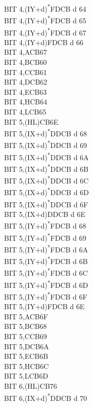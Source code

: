 \documentclass[twoside,openright,a4paper]{book}
\begin{document}
\begin{multicols}{3}
{\begin{tabbing}
	BIT 4,(IY+d)\textsuperscript{*}\>FDCB d 64\\
	BIT 4,(IY+d)\textsuperscript{*}\>FDCB d 65\\
	BIT 4,(IY+d)\textsuperscript{*}\>FDCB d 67\\
	BIT 4,(IY+d)\>FDCB d 66\\
	BIT 4,A\>CB67\\
	BIT 4,B\>CB60\\
	BIT 4,C\>CB61\\
	BIT 4,D\>CB62\\
	BIT 4,E\>CB63\\
	BIT 4,H\>CB64\\
	BIT 4,L\>CB65\\
	BIT 5,(HL)\>CB6E\\
	BIT 5,(IX+d)\textsuperscript{*}\>DDCB d 68\\
	BIT 5,(IX+d)\textsuperscript{*}\>DDCB d 69\\
	BIT 5,(IX+d)\textsuperscript{*}\>DDCB d 6A\\
	BIT 5,(IX+d)\textsuperscript{*}\>DDCB d 6B\\
	BIT 5,(IX+d)\textsuperscript{*}\>DDCB d 6C\\
	BIT 5,(IX+d)\textsuperscript{*}\>DDCB d 6D\\
	BIT 5,(IX+d)\textsuperscript{*}\>DDCB d 6F\\
	BIT 5,(IX+d)\>DDCB d 6E\\
	BIT 5,(IY+d)\textsuperscript{*}\>FDCB d 68\\
	BIT 5,(IY+d)\textsuperscript{*}\>FDCB d 69\\
	BIT 5,(IY+d)\textsuperscript{*}\>FDCB d 6A\\
	BIT 5,(IY+d)\textsuperscript{*}\>FDCB d 6B\\
	BIT 5,(IY+d)\textsuperscript{*}\>FDCB d 6C\\
	BIT 5,(IY+d)\textsuperscript{*}\>FDCB d 6D\\
	BIT 5,(IY+d)\textsuperscript{*}\>FDCB d 6F\\
	BIT 5,(IY+d)\>FDCB d 6E\\
	BIT 5,A\>CB6F\\
	BIT 5,B\>CB68\\
	BIT 5,C\>CB69\\
	BIT 5,D\>CB6A\\
	BIT 5,E\>CB6B\\
	BIT 5,H\>CB6C\\
	BIT 5,L\>CB6D\\
	BIT 6,(HL)\>CB76\\
	BIT 6,(IX+d)\textsuperscript{*}\>DDCB d 70\\

\end{tabbing}}
\end{multicols}
\end{document}
